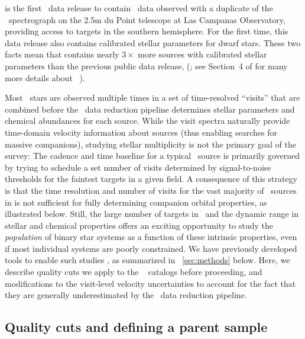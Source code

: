 \documentclass[modern]{aastex63}
\begin{document}
 is the first \sdss\ data release to contain \apogee\ data observed with
a duplicate of the \apogee\ spectrograph on the 2.5m du Point telescope at Las
Campanas Observatory, providing access to targets in the southern hemisphere.
For the first time, this data release also contains calibrated stellar
parameters for dwarf stars.
These two facts mean that  contains nearly $3\times$ more sources with
calibrated stellar parameters than the previous public data release, 
(\citealt{Abolfathi:2017}; see Section~4 of \citealt{DR16} for many more details
about \apogee\ ).

Most \apogee\ stars are observed multiple times in a set of time-resolved
``visits'' that are combined before the \apogee\ data reduction pipeline
\citep{ASPCAP} determines stellar parameters and chemical abundances for each
source.
While the visit spectra naturally provide time-domain velocity information about
sources (thus enabling searches for massive companions), studying stellar
multiplicity is not the primary goal of the survey:
The cadence and time baseline for a typical \apogee\ source is primarily
governed by trying to schedule a set number of visits determined by
signal-to-noise thresholds for the faintest targets in a given field.
A consequence of this strategy is that the time resolution and number of visits
for the vast majority of \apogee\ sources in  is not sufficient for fully
determining companion orbital properties, as illustrated below.
Still, the large number of targets in \apogee\ and the dynamic range in stellar
and chemical properties offers an exciting opportunity to study the
\emph{population} of binary star systems as a function of these intrinsic
properties, even if most individual systems are poorly constrained.
We have previously developed tools to enable such studies \citep{thejoker}, as
summarized in \sectionname~\ref{sec:methods} below.
Here, we describe quality cuts we apply to the \apogee\  catalogs before
proceeding, and modifications to the visit-level velocity uncertainties to
account for the fact that they are generally underestimated by the \apogee\ data
reduction pipeline.


\subsection{Quality cuts and defining a parent sample}
\end{document}
